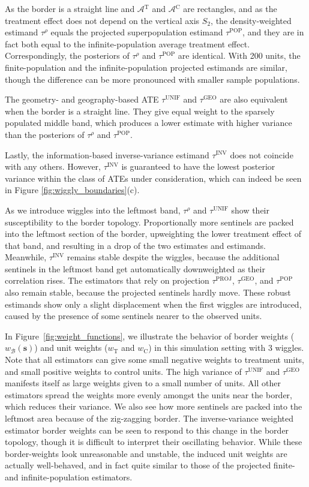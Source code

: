 \documentclass[letter]{article}
\newcommand{\area}{\mathcal{A}}
\newcommand{\treat}{\mathrm{T}}
\newcommand{\ctrol}{\mathrm{C}}
\newcommand{\treatarea}{\area{}^{\treat}}
\newcommand{\ctrolarea}{\area{}^{\ctrol}}
\newcommand{\svec}{\mathbold{s}}
\newcommand{\boundary}{\mathcal{B}}
\newcommand{\unifavg}{\tau^{\mathrm{UNIF}}}
\newcommand{\invvar}{\tau^{\mathrm{INV}}}
\newcommand{\taurho}{\tau^{\rho}}
\newcommand{\tauproj}{\tau^{\mathrm{PROJ}}}
\newcommand{\taugeo}{\tau^{\mathrm{GEO}}}
\newcommand{\taupop}{\tau^{\mathrm{POP}}}
\newcommand{\weightb}{w_{\boundary}}
\newcommand{\wt}{w_{\treat}}
\newcommand{\wc}{w_{\ctrol}}
\begin{document}
As the border is a straight line and \(\treatarea\) and \(\ctrolarea\) are rectangles,
and as the treatment effect does not depend on the vertical axis \(S_2\),
the density-weighted estimand \(\taurho\) equals the projected superpopulation estimand \(\taupop\),
and they are in fact both equal to the infinite-population average treatment effect.
Correspondingly, the posteriors of \(\taurho\) and \(\taupop\) are identical.
With 200 units, the finite-population and the infinite-population projected estimands are similar, though the difference can be more pronounced with smaller sample populations.

The geometry- and geography-based ATE \(\unifavg\) and \(\taugeo\) are also equivalent when the border is a straight line.
They give equal weight to the sparsely populated middle band, which produces a lower estimate with higher variance than the posteriors of \(\taurho\) and \(\taupop\).

Lastly, the information-based inverse-variance estimand \(\invvar\) does not coincide with any others.
However, \(\invvar\) is guaranteed to have the lowest posterior variance within the class of ATEs under consideration, which can indeed be seen in Figure \ref{fig:wiggly_boundaries}(c).

As we introduce wiggles into the leftmost band,
\(\taurho\) and \(\unifavg\) show their susceptibility to the border topology.
Proportionally more sentinels are packed into the leftmost section of the border,
upweighting the lower treatment effect of that band,
and resulting in a drop of the two estimates and estimands.
Meanwhile, \(\invvar\) remains stable despite the wiggles,
because the additional sentinels in the leftmost
band get automatically downweighted as their correlation rises.
The estimators that rely on projection
\(\tauproj\), \(\taugeo\), and \(\taupop\) also remain stable,
because the projected sentinels hardly move.
These robust estimands show only a slight displacement when the first wiggles are introduced,
caused by the presence of some sentinels nearer to the observed units.
    


    	In Figure~\ref{fig:weight_functions}, we illustrate the behavior of border weights (\(\weightb(\svec)\)) and unit weights (\(\wt\) and \(\wc\)) in this simulation setting with 3 wiggles.
Note that all estimators can give some small negative weights to treatment units, and small positive weights to control units.
The high variance of \(\unifavg\) and \(\taugeo\) manifests itself as large weights given to a small number of units.
All other estimators spread the weights more evenly amongst the units near the border, which reduces their variance.
We also see how more sentinels are packed into the leftmost area because of the zig-zagging border.
The inverse-variance weighted estimator border weights can be seen to respond to this change in the border topology, though it is difficult to interpret their oscillating behavior.
While these border-weights look unreasonable and unstable, the induced unit weights are actually well-behaved, and in fact quite similar to those of the projected finite- and infinite-population estimators.
\end{document}
